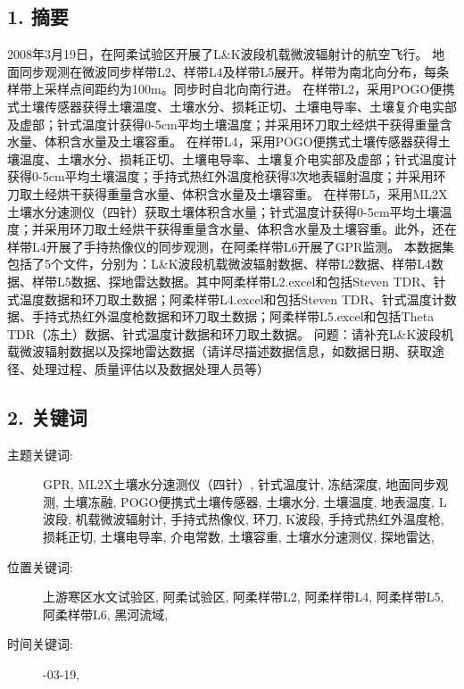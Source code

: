 \documentclass[letterpaper,10pt,english]{sphinxmanual}
\begin{document}
\subsection{1. 摘要}
\label{fecd46b0-3390-4580-a415-2d49ba77f9bd:id1}
2008年3月19日，在阿柔试验区开展了L\&K波段机载微波辐射计的航空飞行。 地面同步观测在微波同步样带L2、样带L4及样带L5展开。样带为南北向分布，每条样带上采样点间距约为100m。同步时自北向南行进。 在样带L2，采用POGO便携式土壤传感器获得土壤温度、土壤水分、损耗正切、土壤电导率、土壤复介电实部及虚部；针式温度计获得0-5cm平均土壤温度；并采用环刀取土经烘干获得重量含水量、体积含水量及土壤容重。 在样带L4，采用POGO便携式土壤传感器获得土壤温度、土壤水分、损耗正切、土壤电导率、土壤复介电实部及虚部；针式温度计获得0-5cm平均土壤温度；手持式热红外温度枪获得3次地表辐射温度；并采用环刀取土经烘干获得重量含水量、体积含水量及土壤容重。 在样带L5，采用ML2X土壤水分速测仪（四针）获取土壤体积含水量；针式温度计获得0-5cm平均土壤温度；并采用环刀取土经烘干获得重量含水量、体积含水量及土壤容重。此外，还在样带L4开展了手持热像仪的同步观测，在阿柔样带L6开展了GPR监测。 本数据集包括了5个文件，分别为：L\&K波段机载微波辐射数据、样带L2数据、样带L4数据、样带L5数据、探地雷达数据。其中阿柔样带L2.excel和包括Steven TDR、针式温度数据和环刀取土数据；阿柔样带L4.excel和包括Steven TDR、针式温度计数据、手持式热红外温度枪数据和环刀取土数据；阿柔样带L5.excel和包括Theta TDR（冻土）数据、针式温度计数据和环刀取土数据。 问题：请补充L\&K波段机载微波辐射数据以及探地雷达数据（请详尽描述数据信息，如数据日期、获取途径、处理过程、质量评估以及数据处理人员等）


\subsection{2. 关键词}
\label{fecd46b0-3390-4580-a415-2d49ba77f9bd:id2}\begin{description}
\item[{主题关键词:}] \leavevmode
GPR, ML2X土壤水分速测仪（四针）, 针式温度计, 冻结深度, 地面同步观测, 土壤冻融, POGO便携式土壤传感器, 土壤水分, 土壤温度, 地表温度, L波段, 机载微波辐射计, 手持式热像仪, 环刀, K波段, 手持式热红外温度枪, 损耗正切, 土壤电导率, 介电常数, 土壤容重, 土壤水分速测仪, 探地雷达,

\item[{位置关键词:}] \leavevmode
上游寒区水文试验区, 阿柔试验区, 阿柔样带L2, 阿柔样带L4, 阿柔样带L5, 阿柔样带L6, 黑河流域,

\item[{时间关键词:}] -03-19,

\end{description}
\end{document}
